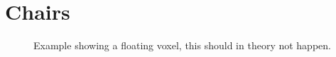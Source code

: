 \section{Chairs}

\begin{figure}[h]
\centering
{}
\caption{Example showing a floating voxel, this should in theory not happen.}
\label{fig:chair:floatvox}
\end{figure}
